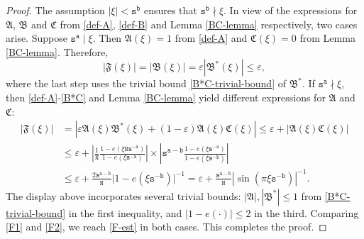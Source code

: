 \documentclass[12pt, twoside]{article}
\theoremstyle{definition}
\numberwithin{equation}{section}
\begin{document}
\begin{proof} 
The assumption $|\xi| < \mathtt s^{\mathtt b}$ ensures that $\mathtt s^{\mathtt b} \nmid \xi$. In view of the expressions for $\mathfrak A$, $\mathfrak B$ and $\mathfrak C$ from \eqref{def-A}, \eqref{def-B} and Lemma \ref{BC-lemma} respectively, two cases arise. 
\vskip0.1in
 Suppose $\mathtt s^{\mathtt a} \mid \xi$. Then $\mathfrak A(\xi) = 1$ from \eqref{def-A} and $\mathfrak C(\xi) = 0$ from Lemma \ref{BC-lemma}. Therefore, 
\begin{equation}  
|\mathfrak F(\xi)| = | \mathfrak B(\xi) | = \varepsilon |\mathfrak B^{\ast}(\xi)| \leq \varepsilon,     \label{F1} 
\end{equation} 
where the last step uses the trivial bound \eqref{B*C-trivial-bound} of $\mathfrak B^{\ast}$.
\vskip0.1in 
 If $\mathtt s^{\mathtt a} \nmid \xi$, then \eqref{def-A}-\eqref{B*C} and Lemma \ref{BC-lemma} yield different expressions for $\mathfrak A$ and $\mathfrak C$:  
\begin{align} 
|\mathfrak F(\xi)| &= |\varepsilon \mathfrak A(\xi) \mathfrak B^{\ast}(\xi) +  (1 - \varepsilon) \mathfrak A(\xi) \mathfrak C(\xi)| \leq \varepsilon + |\mathfrak A(\xi) \mathfrak C(\xi)| \nonumber \\ 
&\leq \varepsilon + \left|\frac{1}{\mathtt N}\frac{1 - e(\xi \mathtt N \mathtt s^{-\mathtt a})}{1 - e(\xi \mathtt s^{-\mathtt a})} \right| \times \left|\mathtt s^{\mathtt a - \mathtt b}\frac{1 - e(\xi \mathtt s^{-\mathtt a})}{1 - e(\xi \mathtt s^{-\mathtt b})} \right| \nonumber \\
&\leq \varepsilon + \frac{2\mathtt s^{\mathtt a - \mathtt b}}{\mathtt N} \bigl| 1 - e(\xi \mathtt s^{-\mathtt b}) \bigr|^{-1} =  \varepsilon + \frac{\mathtt s^{\mathtt a - \mathtt b}}{\mathtt N} |\sin(\pi \xi \mathtt s^{-\mathtt b})|^{-1}.  \label{F2} 
\end{align} 
The display above incorporates several trivial bounds: $|\mathfrak A|, |\mathfrak B^{\ast}| \leq 1$ from \eqref{B*C-trivial-bound} in the first inequality, and $|1 - e(\cdot)| \leq 2$ in the third.  
\vskip0.1in 
\noindent Comparing \eqref{F1} and \eqref{F2}, we reach \eqref{F-est} in both cases. This completes the proof. 
\end{proof} 
\end{document}
